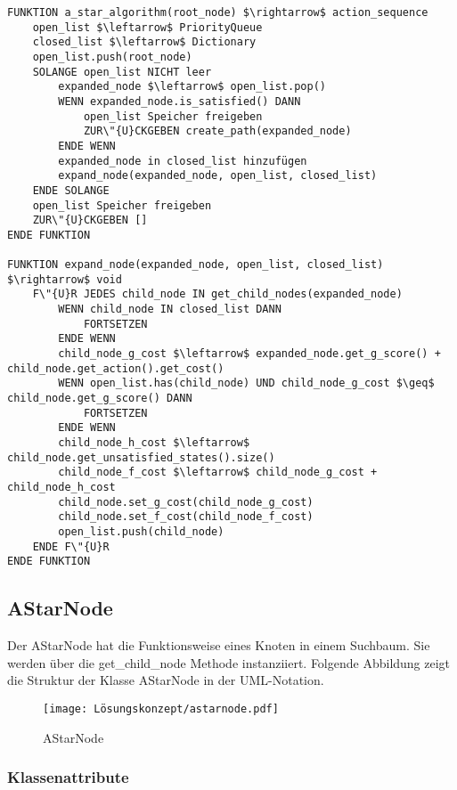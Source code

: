 \begin{lstlisting}[language=Pseudo, caption={update Methode des GoapAgent}, mathescape=true]
FUNKTION a_star_algorithm(root_node) $\rightarrow$ action_sequence
	open_list $\leftarrow$ PriorityQueue
	closed_list $\leftarrow$ Dictionary
	open_list.push(root_node)
	SOLANGE open_list NICHT leer
		expanded_node $\leftarrow$ open_list.pop()
		WENN expanded_node.is_satisfied() DANN
			open_list Speicher freigeben
			ZUR\"{U}CKGEBEN create_path(expanded_node)
		ENDE WENN
		expanded_node in closed_list hinzufügen
		expand_node(expanded_node, open_list, closed_list)
	ENDE SOLANGE
	open_list Speicher freigeben
	ZUR\"{U}CKGEBEN []
ENDE FUNKTION

FUNKTION expand_node(expanded_node, open_list, closed_list) $\rightarrow$ void
	F\"{U}R JEDES child_node IN get_child_nodes(expanded_node)
		WENN child_node IN closed_list DANN
			FORTSETZEN
		ENDE WENN
		child_node_g_cost $\leftarrow$ expanded_node.get_g_score() + child_node.get_action().get_cost()
		WENN open_list.has(child_node) UND child_node_g_cost $\geq$ child_node.get_g_score() DANN
			FORTSETZEN
		ENDE WENN
		child_node_h_cost $\leftarrow$ child_node.get_unsatisfied_states().size()
		child_node_f_cost $\leftarrow$ child_node_g_cost + child_node_h_cost
		child_node.set_g_cost(child_node_g_cost)
		child_node.set_f_cost(child_node_f_cost)
		open_list.push(child_node)
	ENDE F\"{U}R
ENDE FUNKTION
\end{lstlisting}

\subsection{AStarNode}
\label{chap:astarnode uml}

Der AStarNode hat die Funktionsweise eines Knoten in einem Suchbaum. Sie werden über die get\_child\_node Methode instanziiert. Folgende Abbildung zeigt die Struktur der Klasse AStarNode in der UML-Notation.

\begin{figure}[h]
  \centering
  \texttt{[image: Lösungskonzept/astarnode.pdf]}
	\captionsetup{justification=justified, format=plain}
  \caption{AStarNode}
  \label{fig:AStarNode}
\end{figure}


\subsubsection{Klassenattribute}
\label{chap:astarnode klassenattribute}

